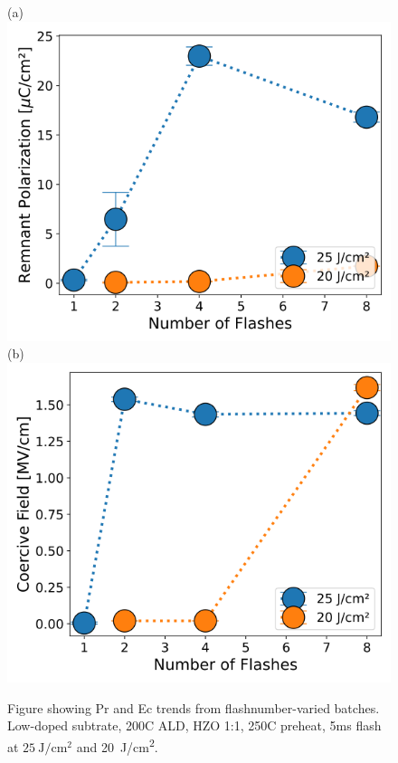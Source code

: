 \documentclass[11pt]{article}
\begin{document}
    \begin{figure}[ht!]
        \centering
        (a)\includegraphics[width=.45\textwidth]{../Fig/FlashNumA+C_PrTrends.png}
        (b)\includegraphics[width=.45\textwidth]{../Fig/FlashNumA+C_EcTrends.png}
        \caption{Figure showing Pr and Ec trends from flashnumber-varied batches. Low-doped subtrate, 200C ALD, HZO 1:1, 250C preheat, 5ms flash at $\SI{25}{\joule/\centi\meter^2}$ and \SI{20}{\joule/\centi\meter^2}.}\label{fig:res_FlashNumAC_PrEc}
    \end{figure}
\end{document}
